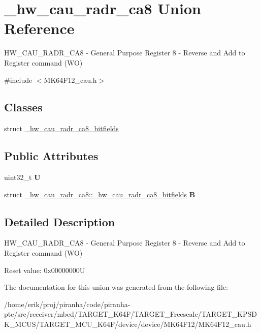 \hypertarget{union__hw__cau__radr__ca8}{}\section{\+\_\+hw\+\_\+cau\+\_\+radr\+\_\+ca8 Union Reference}
\label{union__hw__cau__radr__ca8}


H\+W\+\_\+\+C\+A\+U\+\_\+\+R\+A\+D\+R\+\_\+\+C\+A8 -\/ General Purpose Register 8 -\/ Reverse and Add to Register command (WO)  




{\ttfamily \#include $<$M\+K64\+F12\+\_\+cau.\+h$>$}

\subsection*{Classes}
\begin{DoxyCompactItemize}
\item 
struct \hyperlink{struct__hw__cau__radr__ca8_1_1__hw__cau__radr__ca8__bitfields}{\+\_\+hw\+\_\+cau\+\_\+radr\+\_\+ca8\+\_\+bitfields}
\end{DoxyCompactItemize}
\subsection*{Public Attributes}
\begin{DoxyCompactItemize}
\item 
uint32\+\_\+t {\bfseries U}\hypertarget{union__hw__cau__radr__ca8_a0606bac825a4602d99b0b1359f602b38}{}\label{union__hw__cau__radr__ca8_a0606bac825a4602d99b0b1359f602b38}

\item 
struct \hyperlink{struct__hw__cau__radr__ca8_1_1__hw__cau__radr__ca8__bitfields}{\+\_\+hw\+\_\+cau\+\_\+radr\+\_\+ca8\+::\+\_\+hw\+\_\+cau\+\_\+radr\+\_\+ca8\+\_\+bitfields} {\bfseries B}\hypertarget{union__hw__cau__radr__ca8_a3d403acbaecf8d14e366a29f9083438a}{}\label{union__hw__cau__radr__ca8_a3d403acbaecf8d14e366a29f9083438a}

\end{DoxyCompactItemize}


\subsection{Detailed Description}
H\+W\+\_\+\+C\+A\+U\+\_\+\+R\+A\+D\+R\+\_\+\+C\+A8 -\/ General Purpose Register 8 -\/ Reverse and Add to Register command (WO) 

Reset value\+: 0x00000000U 

The documentation for this union was generated from the following file\+:\begin{DoxyCompactItemize}
\item 
/home/erik/proj/piranha/code/piranha-\/ptc/src/receiver/mbed/\+T\+A\+R\+G\+E\+T\+\_\+\+K64\+F/\+T\+A\+R\+G\+E\+T\+\_\+\+Freescale/\+T\+A\+R\+G\+E\+T\+\_\+\+K\+P\+S\+D\+K\+\_\+\+M\+C\+U\+S/\+T\+A\+R\+G\+E\+T\+\_\+\+M\+C\+U\+\_\+\+K64\+F/device/device/\+M\+K64\+F12/M\+K64\+F12\+\_\+cau.\+h\end{DoxyCompactItemize}
